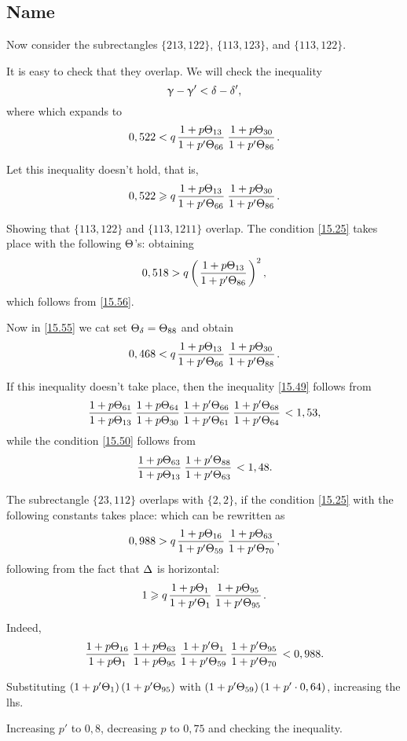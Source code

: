 \subsection{Name}

Now consider the subrectangles $\{213, 122\}$, $\{113, 123\}$, and $\{113, 122\}$.

It is easy to check that they overlap.
We will check the inequality
\begin{equation}\label{15.55}
	\upgamma - \upgamma' < \delta - \delta',
\end{equation}
where
which expands to
\begin{equation*}
	0,522 < q \up{13}{66} \up{30}{86}.
\end{equation*}

Let this inequality doesn't hold, that is,
\begin{equation}\label{15.56}
	0,522 \geqslant q \up{13}{66} \up{30}{86}.
\end{equation}

Showing that $\{113, 122\}$ and $\{113, 1211\}$ overlap.
The condition \ref{15.25} takes place with the following $\Theta$'s:
obtaining
\begin{equation*}
	0,518 > q \left(\mkern 2mu \dfrac{1 + {p} \Theta_{13}}{1 + {p'} \Theta_{86}} \mkern 2mu\right)^2,
\end{equation*}
which follows from \ref{15.56}.

Now in \ref{15.55} we cat set $\Theta_{\delta} = \Theta_{88}$ and obtain
\begin{equation*}
	0,468 < q \up{13}{66} \up{30}{88}.
\end{equation*}

If this inequality doesn't take place, then the inequality \ref{15.49} follows from
\begin{equation*}
	\uu{61}{13} \uu{64}{30} \pp{66}{61} \pp{68}{64} < 1,53,
\end{equation*}
while the condition \ref{15.50} follows from
\begin{equation*}
	\uu{63}{13} \pp{88}{63} < 1,48.
\end{equation*}

The subrectangle $\{23, 112\}$ overlaps with $\{2, 2\}$,
if the condition \ref{15.25} with the following constants takes place:
which can be rewritten as
\begin{equation*}
	0,988 > q \up{16}{59} \up{63}{70},
\end{equation*}
following from the fact that $\Delta$ is horizontal:
\begin{equation*}
	1 \geqslant q \up{1}{1} \up{95}{95}.
\end{equation*}

Indeed,
\begin{equation*}
	\uu{16}{1} \uu{63}{95} \pp{1}{59} \pp{95}{70} < 0,988.
\end{equation*}

Substituting $\left(1 + p' \Theta_{1}\right)\left(1 + p' \Theta_{95}\right)$
with $\left(1 + p' \Theta_{59}\right)\left(1 + p' \cdot 0,64\right)$, increasing the lhs.

Increasing $p'$ to $0,8$, decreasing $p$ to $0,75$ and checking the inequality.


